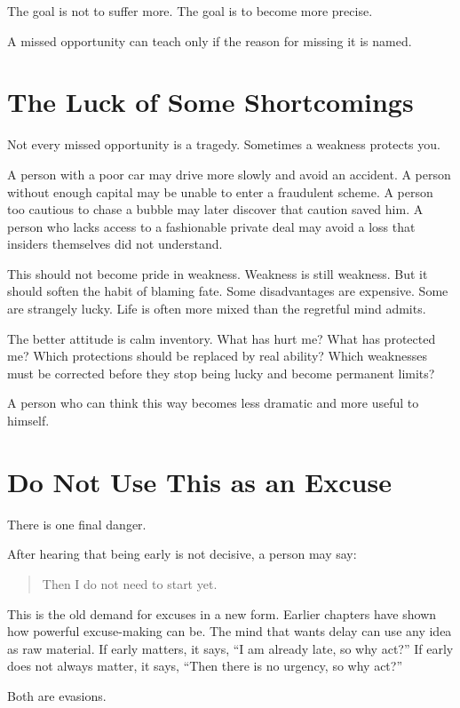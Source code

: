 The goal is not to suffer more. The goal is to become more precise.

A missed opportunity can teach only if the reason for missing it is named.

\section*{The Luck of Some Shortcomings}

Not every missed opportunity is a tragedy. Sometimes a weakness protects you.

A person with a poor car may drive more slowly and avoid an accident. A person without enough capital may be unable to enter a fraudulent scheme. A person too cautious to chase a bubble may later discover that caution saved him. A person who lacks access to a fashionable private deal may avoid a loss that insiders themselves did not understand.

This should not become pride in weakness. Weakness is still weakness. But it should soften the habit of blaming fate. Some disadvantages are expensive. Some are strangely lucky. Life is often more mixed than the regretful mind admits.

The better attitude is calm inventory. What has hurt me? What has protected me? Which protections should be replaced by real ability? Which weaknesses must be corrected before they stop being lucky and become permanent limits?

A person who can think this way becomes less dramatic and more useful to himself.

\section*{Do Not Use This as an Excuse}

There is one final danger.

After hearing that being early is not decisive, a person may say:

\begin{quote}
Then I do not need to start yet.
\end{quote}

This is the old demand for excuses in a new form. Earlier chapters have shown how powerful excuse-making can be. The mind that wants delay can use any idea as raw material. If early matters, it says, ``I am already late, so why act?'' If early does not always matter, it says, ``Then there is no urgency, so why act?''

Both are evasions.

